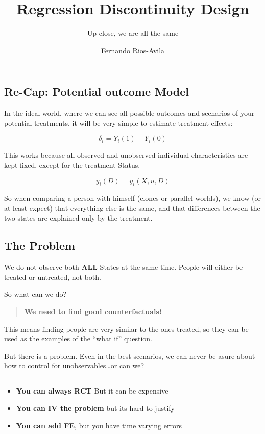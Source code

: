 \documentclass[
  letterpaper,
  DIV=11,
  numbers=noendperiod]{scrartcl}
\title{Regression Discontinuity Design}
\subtitle{Up close, we are all the same}
\author{Fernando Rios-Avila}
\date{}
\begin{document}
\maketitle
\subsection{Re-Cap: Potential outcome
Model}\label{re-cap-potential-outcome-model}

In the ideal world, where we can see all possible outcomes and scenarios
of your potential treatments, it will be very simple to estimate
treatment effects:

\[
\delta_i = Y_i(1)-Y_i(0)
\]

This works because all observed and unobserved individual
characteristics are kept fixed, except for the treatment Status.

\[y_i(D)=y_i(X,u,D)\]

So when comparing a person with himself (clones or parallel worlds), we
know (or at least expect) that everything else is the same, and that
differences between the two states are explained only by the treatment.

\subsection{The Problem}\label{the-problem}

We do not observe both \textbf{ALL} States at the same time. People will
either be treated or untreated, not both.

So what can we do?

\begin{quote}
\textbf{We need to find good counterfactuals!}
\end{quote}

This means finding people are very similar to the ones treated, so they
can be used as the examples of the ``what if'' question.

But there is a problem. Even in the best scenarios, we can never be
asure about how to control for unobservables\ldots or can we?

\subsection{}\label{section}

\begin{itemize}
\item
  \textbf{You can always RCT} But it can be expensive
\item
  \textbf{You can IV the problem} but its hard to justify
\item
  \textbf{You can add FE}, but you have time varying errors
\end{itemize}
\end{document}

